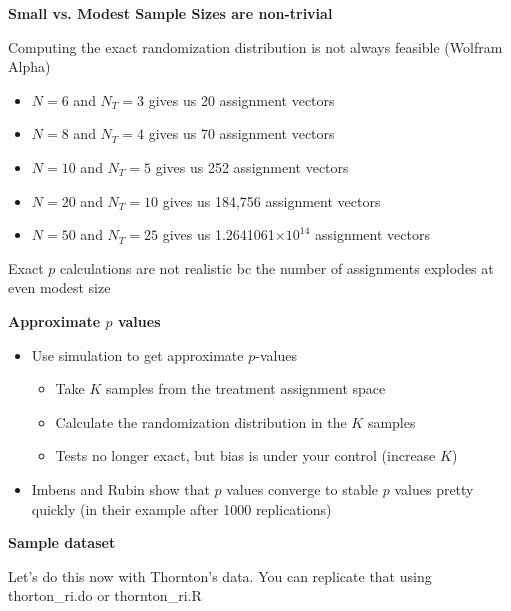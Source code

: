 \documentclass[notes=show]{beamer}
\begin{document}
\begin{frame}[plain]
\begin{center}
\textbf{Small vs. Modest Sample Sizes are non-trivial}
\end{center}

Computing the exact randomization distribution is not always feasible (Wolfram Alpha)
\begin{itemize}
\item $N=6$ and $N_T=3$ gives us 20 assignment vectors
\item $N=8$ and $N_T=4$ gives us 70 assignment vectors
\item $N=10$ and $N_T=5$ gives us 252 assignment vectors
\item $N=20$ and $N_T=10$ gives us 184,756 assignment vectors
\item $N=50$ and $N_T=25$ gives us 1.2641061$\times 10^{14}$ assignment vectors
\end{itemize}
Exact $p$ calculations are not realistic bc the number of assignments explodes at even modest size

\end{frame}

\begin{frame}[plain]

\begin{center}
\textbf{Approximate $p$ values}
\end{center}

\begin{itemize}
\item Use simulation to get approximate $p$-values
	\begin{itemize}
	\item Take $K$ samples from the treatment assignment space
	\item Calculate the randomization distribution in the $K$ samples
	\item Tests no longer exact, but bias is under your control (increase $K$)
	\end{itemize}
\item Imbens and Rubin show that $p$ values converge to stable $p$ values pretty quickly (in their example after 1000 replications)
\end{itemize}

\end{frame}



\begin{frame}[plain]
\begin{center}
\textbf{Sample dataset}
\end{center}

Let's do this now with Thornton's data.  You can replicate that using thorton\_ri.do or thornton\_ri.R

\end{frame}
\end{document}
